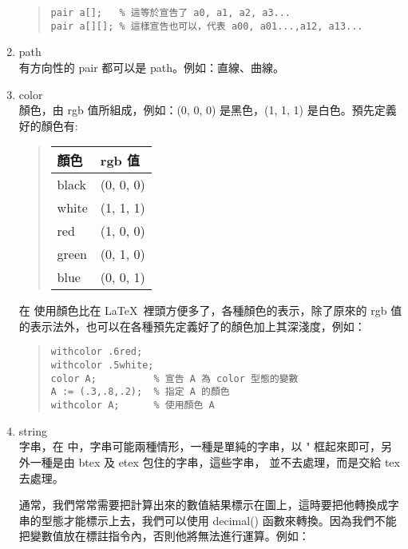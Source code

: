 \begin{enumerate}
        \begin{quote}
          \begin{verbatim}
pair a[];   % 這等於宣告了 a0, a1, a2, a3...
pair a[][]; % 這樣宣告也可以，代表 a00, a01...,a12, a13...
\end{verbatim}
        \end{quote}

  \item path\\
        有方向性的 pair 都可以是 path。例如：直線、曲線。
  \item color\\
        顏色，由 rgb 值所組成，例如：(0, 0, 0) 是黑色，(1, 1, 1) 是白色。預先定義好的顏色有:
        \begin{quote}
          \begin{tabular}{>{\ttfamily }ll}
            顏色  & rgb 值    \\
            \hline
            black & (0, 0, 0) \\
            white & (1, 1, 1) \\
            red   & (1, 0, 0) \\
            green & (0, 1, 0) \\
            blue  & (0, 0, 1)
          \end{tabular}
        \end{quote}

        在 \MP{} 使用顏色比在 \LaTeX\ 裡頭方便多了，各種顏色的表示，除了原來的 rgb 值的表示法外，也可以在各種預先定義好了的顏色加上其深淺度，例如：

        \begin{quote}
          \begin{verbatim}
withcolor .6red;
withcolor .5white;
color A;          % 宣告 A 為 color 型態的變數
A := (.3,.8,.2);  % 指定 A 的顏色
withcolor A;      % 使用顏色 A
\end{verbatim}
        \end{quote}

  \item string\\
        字串，在 \MP{} 中，字串可能兩種情形，一種是單純的字串，以 {\ttfamily "} 框起來即可，另外一種是由 {\ttfamily btex} 及 {\ttfamily etex} 包住的字串，這些字串，\MP{} 並不去處理，而是交給 {\ttfamily tex} 去處理。

        通常，我們常常需要把計算出來的數值結果標示在圖上，這時要把他轉換成字串的型態才能標示上去，我們可以使用 {\ttfamily decimal()} 函數來轉換。因為我們不能把變數值放在標註指令內，否則他將無法進行運算。例如：


\end{enumerate}
